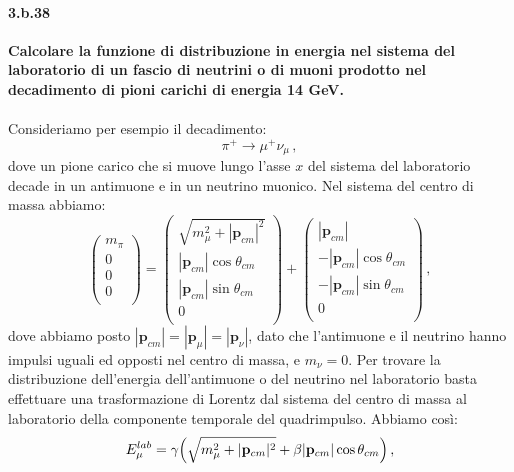 \documentclass[twoside]{article}
\begin{document}
\paragraph{3.b.38}\textbf{Calcolare la funzione di distribuzione in energia nel sistema del laboratorio di un fascio di neutrini o di muoni prodotto nel decadimento di pioni carichi di energia
14 GeV.}\\
\\
Consideriamo per esempio il decadimento:
\begin{equation}
\pi^+ \rightarrow \mu^+ \nu_{\mu} \, ,
\end{equation}
dove un pione carico che si muove lungo l'asse $x$ del sistema del laboratorio decade in un antimuone e in un neutrino muonico. Nel sistema del centro di massa abbiamo:
\begin{equation}
\begin{pmatrix}
m_\pi \\
0 \\
0 \\
0 \\
\end{pmatrix}
=
\begin{pmatrix}
\sqrt{m_{\mu}^2+|\mathbf{p}_{cm}|^2} \\
|\mathbf{p}_{cm}|\cos\theta_{cm} \\
|\mathbf{p}_{cm}|\sin\theta_{cm} \\
0 \\
\end{pmatrix}
+
\begin{pmatrix}
|\mathbf{p}_{cm}| \\
-|\mathbf{p}_{cm}|\cos\theta_{cm} \\
-|\mathbf{p}_{cm}|\sin\theta_{cm} \\
0 \\
\end{pmatrix} \, ,
\end{equation}
dove abbiamo posto $|\mathbf{p}_{cm}|=|\mathbf{p}_\mu|=|\mathbf{p}_\nu|$, dato che l'antimuone e il neutrino hanno impulsi uguali ed opposti nel centro di massa, e $m_\nu=0$. Per trovare la distribuzione dell'energia dell'antimuone o del neutrino nel laboratorio basta effettuare una trasformazione di Lorentz dal sistema del centro di massa al laboratorio della componente temporale del quadrimpulso. Abbiamo così:
\begin{equation}
E_\mu^{lab}=\gamma \Bigl(\sqrt{m_{\mu}^2+|\mathbf{p}_{cm}|^2}+\beta|\mathbf{p}_{cm}|\cos\theta_{cm} \Bigr) \, ,
\end{equation}
\end{document}
